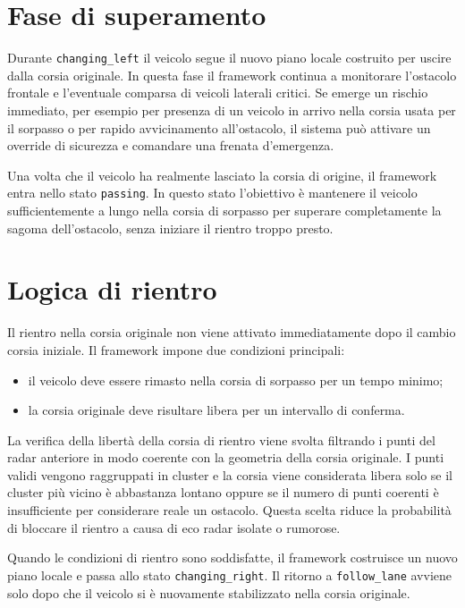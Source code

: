 \section{Fase di superamento}

Durante \texttt{changing\_left} il veicolo segue il nuovo piano locale costruito per uscire dalla corsia originale. In questa fase il framework continua a monitorare l'ostacolo frontale e l'eventuale comparsa di veicoli laterali critici. Se emerge un rischio immediato, per esempio per presenza di un veicolo in arrivo nella corsia usata per il sorpasso o per rapido avvicinamento all'ostacolo, il sistema può attivare un override di sicurezza e comandare una frenata d'emergenza.

Una volta che il veicolo ha realmente lasciato la corsia di origine, il framework entra nello stato \texttt{passing}. In questo stato l'obiettivo è mantenere il veicolo sufficientemente a lungo nella corsia di sorpasso per superare completamente la sagoma dell'ostacolo, senza iniziare il rientro troppo presto.

\section{Logica di rientro}

Il rientro nella corsia originale non viene attivato immediatamente dopo il cambio corsia iniziale. Il framework impone due condizioni principali:

\begin{itemize}
    \item il veicolo deve essere rimasto nella corsia di sorpasso per un tempo minimo;
    \item la corsia originale deve risultare libera per un intervallo di conferma.
\end{itemize}

La verifica della libertà della corsia di rientro viene svolta filtrando i punti del radar anteriore in modo coerente con la geometria della corsia originale. I punti validi vengono raggruppati in cluster e la corsia viene considerata libera solo se il cluster più vicino è abbastanza lontano oppure se il numero di punti coerenti è insufficiente per considerare reale un ostacolo. Questa scelta riduce la probabilità di bloccare il rientro a causa di eco radar isolate o rumorose.

Quando le condizioni di rientro sono soddisfatte, il framework costruisce un nuovo piano locale e passa allo stato \texttt{changing\_right}. Il ritorno a \texttt{follow\_lane} avviene solo dopo che il veicolo si è nuovamente stabilizzato nella corsia originale.


